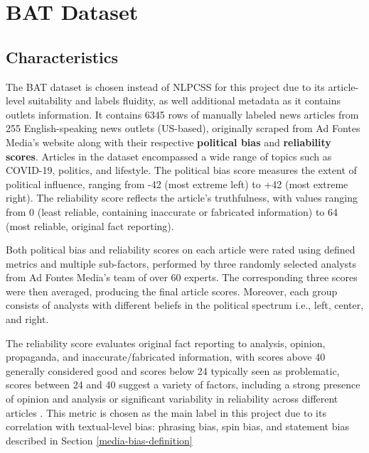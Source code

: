 \chapter{BAT Dataset}
\label{cha:4}

\section{Characteristics} \label{bat-characteristics}

The BAT dataset \cite{spinde-2023-bat} is chosen instead of NLPCSS \cite{chen-2020-nlpcss} for this project due to its article-level suitability and labels fluidity, as well additional metadata as it contains outlets information. It contains 6345 rows of manually labeled news articles from 255 English-speaking news outlets (US-based), originally scraped from Ad Fontes Media's website along with their respective \textbf{political bias} and \textbf{reliability scores}. Articles in the dataset encompassed a wide range of topics such as COVID-19, politics, and lifestyle. The political bias score measures the extent of political influence, ranging from -42 (most extreme left) to +42 (most extreme right). The reliability score reflects the article's truthfulness, with values ranging from 0 (least reliable, containing inaccurate or fabricated information) to 64 (most reliable, original fact reporting).

Both political bias and reliability scores on each article were rated using defined metrics and multiple sub-factors, performed by three randomly selected analysts from Ad Fontes Media's team of over 60 experts. The corresponding three scores were then averaged, producing the final article scores. Moreover, each group consists of analysts with different beliefs in the political spectrum i.e., left, center, and right.

The reliability score evaluates original fact reporting to analysis, opinion, propaganda, and inaccurate/fabricated information, with scores above 40 generally considered good and scores below 24 typically seen as problematic, scores between 24 and 40 suggest a variety of factors, including a strong presence of opinion and analysis or significant variability in reliability across different articles \cite{adfontes}. This metric is chosen as the main label in this project due to its correlation with textual-level bias: phrasing bias, spin bias, and statement bias described in Section \ref{media-bias-definition}

